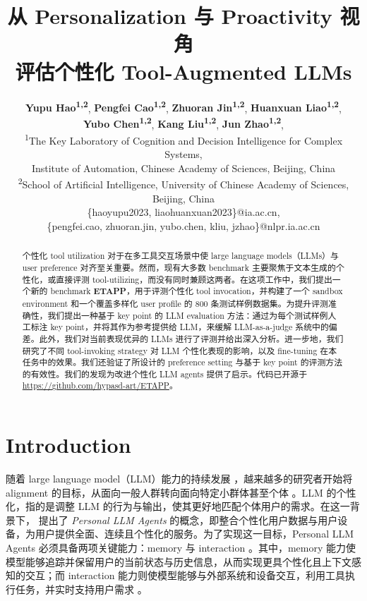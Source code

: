 \documentclass[11pt]{article}
\title{从 Personalization 与 Proactivity 视角\\评估个性化 Tool-Augmented LLMs}
\author{
 \textbf{Yupu Hao\textsuperscript{1,2}},
 \textbf{Pengfei Cao\textsuperscript{1,2}},
 \textbf{Zhuoran Jin\textsuperscript{1,2}},
 \textbf{Huanxuan Liao\textsuperscript{1,2}},
\\
 \textbf{Yubo Chen\textsuperscript{1,2}},
 \textbf{Kang Liu\textsuperscript{1,2}},
 \textbf{Jun Zhao\textsuperscript{1,2}},
\\
 \textsuperscript{1}The Key Laboratory of Cognition and Decision Intelligence for Complex Systems, \\Institute of Automation, Chinese Academy of Sciences, Beijing, China\\
 \textsuperscript{2}School of Artificial Intelligence, University of Chinese Academy of Sciences, Beijing, China
\\
\{haoyupu2023, liaohuanxuan2023\}@ia.ac.cn, \\ \{pengfei.cao, zhuoran.jin, yubo.chen, kliu, jzhao\}@nlpr.ia.ac.cn
}
\begin{document}
\maketitle
\begin{abstract}
个性化 tool utilization 对于在多工具交互场景中使 large language models（LLMs）与 user preference 对齐至关重要。然而，现有大多数 benchmark 主要聚焦于文本生成的个性化，或直接评测 tool-utilizing，而没有同时兼顾这两者。在这项工作中，我们提出一个新的 benchmark \textbf{ETAPP}，用于评测个性化 tool invocation，并构建了一个 sandbox environment 和一个覆盖多样化 user profile 的 800 条测试样例数据集。为提升评测准确性，我们提出一种基于 key point 的 LLM evaluation 方法：通过为每个测试样例人工标注 key point，并将其作为参考提供给 LLM，来缓解 LLM-as-a-judge 系统中的偏差。此外，我们对当前表现优异的 LLMs 进行了评测并给出深入分析。进一步地，我们研究了不同 tool-invoking strategy 对 LLM 个性化表现的影响，以及 fine-tuning 在本任务中的效果。我们还验证了所设计的 preference setting 与基于 key point 的评测方法的有效性。我们的发现为改进个性化 LLM agents 提供了启示。代码已开源于 \url{https://github.com/hypasd-art/ETAPP}。


\end{abstract}

\section{Introduction}
随着 large language model（LLM）能力的持续发展 \cite{zhao2024surveylargelanguagemodels}，越来越多的研究者开始将 alignment 的目标，从面向一般人群转向面向特定小群体甚至个体 \cite{chen2024personapersonalizationsurveyroleplaying, jang2023personalized}。LLM 的个性化，指的是调整 LLM 的行为与输出，使其更好地匹配个体用户的需求。在这一背景下，\citeauthor{li2024personalllmagentsinsights} 提出了 \textit{Personal LLM Agents} 的概念，即整合个性化用户数据与用户设备，为用户提供全面、连续且个性化的服务。为了实现这一目标，Personal LLM Agents 必须具备两项关键能力：memory \cite{zhang2024surveymemorymechanismlarge} 与 interaction \cite{10.1145/3704435, mialon2023augmentedlanguagemodelssurvey}。其中，memory 能力使模型能够追踪并保留用户的当前状态与历史信息，从而实现更具个性化且上下文感知的交互；而 interaction 能力则使模型能够与外部系统和设备交互，利用工具执行任务，并实时支持用户需求 \cite{li-etal-2023-api, DBLP:conf/iclr/QinLYZYLLCTQZHT24}。
\end{document}
